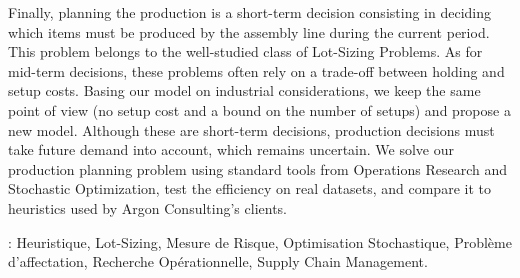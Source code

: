 Finally, planning the production is a short-term decision consisting in deciding which items must be produced by the assembly line during the current period.
This problem belongs to the well-studied class of Lot-Sizing Problems.
As for mid-term decisions, these problems often rely on a trade-off between holding and setup costs.
Basing our model on industrial considerations, we keep the same point of view (no setup cost and a bound on the number of setups) and propose a new model.
Although these are short-term decisions, production decisions must take future demand into account, which remains uncertain.
We solve our production planning problem using standard tools from Operations Research and Stochastic Optimization, test the efficiency on real datasets, and compare it to heuristics used by Argon Consulting's clients.


:
Heuristique,
Lot-Sizing,
Mesure de Risque,
Optimisation Stochastique,
Problème d'affectation,
Recherche Opérationnelle,
Supply Chain Management.

